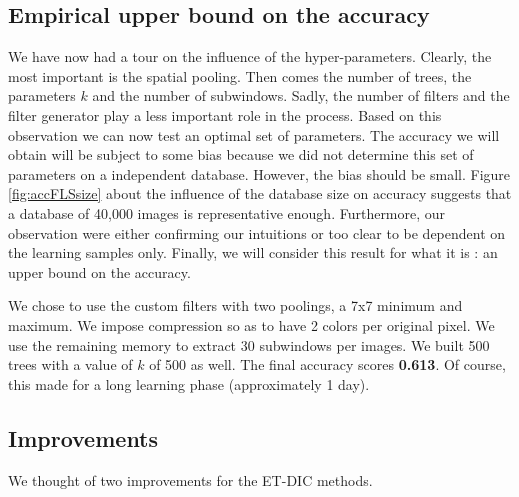 \documentclass[a4paper]{report}
\begin{document}
	\subsection{\label{subsec:UpperBound}Empirical upper bound on the accuracy}
	We have now had a tour on the influence of the hyper-parameters. Clearly, the most important is the spatial pooling. Then comes the number of trees, the parameters $k$ and the number of subwindows. Sadly, the number of filters and the filter generator play a less important role in the process.
	Based on this observation we can now test an optimal set of parameters. The accuracy we will obtain will be subject to some bias because we did not determine this set of parameters on a independent database. However, the bias should be small. Figure \ref{fig:accFLSsize} about the influence of the database size on accuracy suggests that a database of 40,000 images is representative enough. Furthermore, our observation were either confirming our intuitions or too clear to be dependent on the learning samples only. Finally, we will consider this result for what it is : an upper bound on the accuracy.
	\par
	We chose to use the custom filters with two poolings, a 7x7 minimum and maximum. We impose compression so as to have 2 colors per original pixel. We use the remaining memory to extract 30 subwindows per images. We built 500 trees with a value of $k$ of 500 as well. The final accuracy scores \textbf{0.613}. Of course, this made for a long learning phase (approximately 1 day).
	
	\subsection{Improvements}
	We thought of two improvements for the ET-DIC methods. 
	
\end{document}
